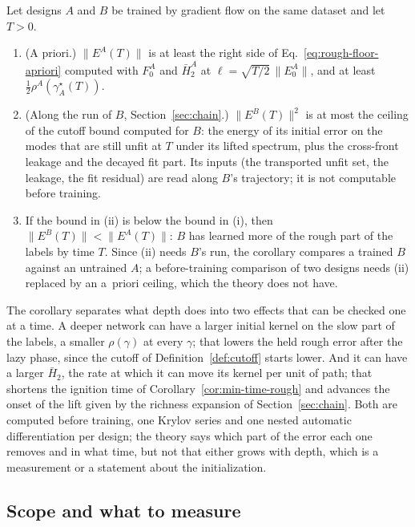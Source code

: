 \begin{corollary}
\label{cor:depth}
Let designs $A$ and $B$ be trained by gradient flow on the same dataset and
let $T>0$.
\begin{enumerate}
\item[(i)] (A priori.) $\|E^A(T)\|$ is at least the right side of
Eq.~\eqref{eq:rough-floor-apriori} computed with $F_0^A$ and $\bar H_2^A$ at
$\ell=\sqrt{T/2}\,\|E_0^A\|$, and at least $\tfrac12\rho^A(\gamma^\star_A(T))$.
\item[(ii)] (Along the run of $B$, Section~\ref{sec:chain}.) $\|E^B(T)\|^2$ is at most the
ceiling of the cutoff bound computed for $B$: the energy of its initial error on
the modes that are still unfit at $T$ under its lifted spectrum, plus the
cross-front leakage and the decayed fit part. Its inputs (the transported
unfit set, the leakage, the fit residual) are read along $B$'s trajectory;
it is not computable before training.
\item[(iii)] If the bound in (ii) is below the bound in (i), then
$\|E^B(T)\|<\|E^A(T)\|$: $B$ has learned more of the rough part of the
labels by time $T$. Since (ii) needs $B$'s run, the corollary compares a
trained $B$ against an untrained $A$; a before-training comparison of two
designs needs (ii) replaced by an a~priori ceiling, which the theory does not
have.
\end{enumerate}
\end{corollary}

The corollary separates what depth does into two effects that can be checked
one at a time. A deeper network can have a larger initial kernel on the slow
part of the labels, a smaller $\rho(\gamma)$ at every $\gamma$; that lowers
the held rough error after the lazy phase, since the cutoff of
Definition~\ref{def:cutoff} starts lower. And it can have a larger
$\bar H_2$, the rate at which it can move its kernel per unit of path; that
shortens the ignition time of Corollary~\ref{cor:min-time-rough} and advances
the onset of the lift given by the richness expansion of
Section~\ref{sec:chain}. Both are computed before training, one Krylov series
and one nested automatic differentiation per design; the theory says which
part of the error each one removes and in what time, but not that either
grows with depth, which is a measurement or a statement about the
initialization.

\subsection{Scope and what to measure}

